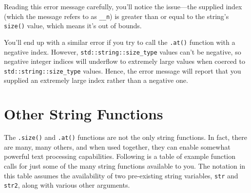 \documentclass{article}
\begin{document}
Reading this error message carefully, you'll notice the issue---the supplied index (which the message refers to as \texttt{\_\_n}) is greater than or equal to the string's \texttt{size()} value, which means it's out of bounds.

You'll end up with a similar error if you try to call the \texttt{.at()} function with a negative index. However, \texttt{std::string::size\_type} values can't be negative, so negative integer indices will underflow to extremely large values when coerced to \texttt{std::string::size\_type} values. Hence, the error message will report that you supplied an extremely large index rather than a negative one.

\section{Other String Functions}

The \texttt{.size()} and \texttt{.at()} functions are not the only string functions. In fact, there are many, many others, and when used together, they can enable somewhat powerful text processing capabilities. Following is a table of example function calls for just some of the many string functions available to you. The notation in this table assumes the availability of two pre-existing string variables, \texttt{str} and \texttt{str2}, along with various other arguments.
\end{document}
